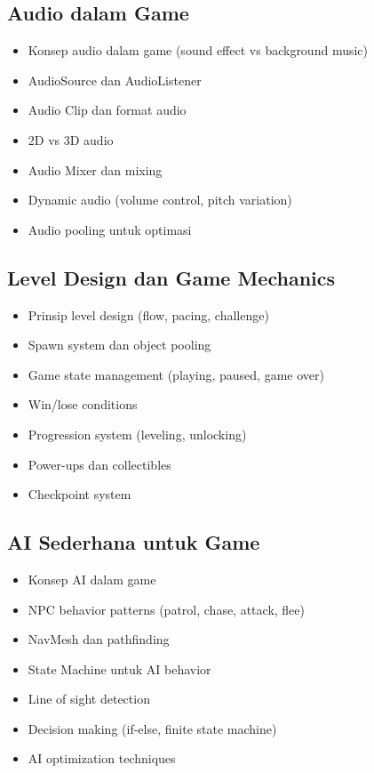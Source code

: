 \documentclass[a4paper,12pt]{article}
\begin{document}
\subsection{Audio dalam Game}
\begin{itemize}
\item Konsep audio dalam game (sound effect vs background music)
\item AudioSource dan AudioListener
\item Audio Clip dan format audio
\item 2D vs 3D audio
\item Audio Mixer dan mixing
\item Dynamic audio (volume control, pitch variation)
\item Audio pooling untuk optimasi
\end{itemize}

\subsection{Level Design dan Game Mechanics}
\begin{itemize}
\item Prinsip level design (flow, pacing, challenge)
\item Spawn system dan object pooling
\item Game state management (playing, paused, game over)
\item Win/lose conditions
\item Progression system (leveling, unlocking)
\item Power-ups dan collectibles
\item Checkpoint system
\end{itemize}

\subsection{AI Sederhana untuk Game}
\begin{itemize}
\item Konsep AI dalam game
\item NPC behavior patterns (patrol, chase, attack, flee)
\item NavMesh dan pathfinding
\item State Machine untuk AI behavior
\item Line of sight detection
\item Decision making (if-else, finite state machine)
\item AI optimization techniques
\end{itemize}
\end{document}
